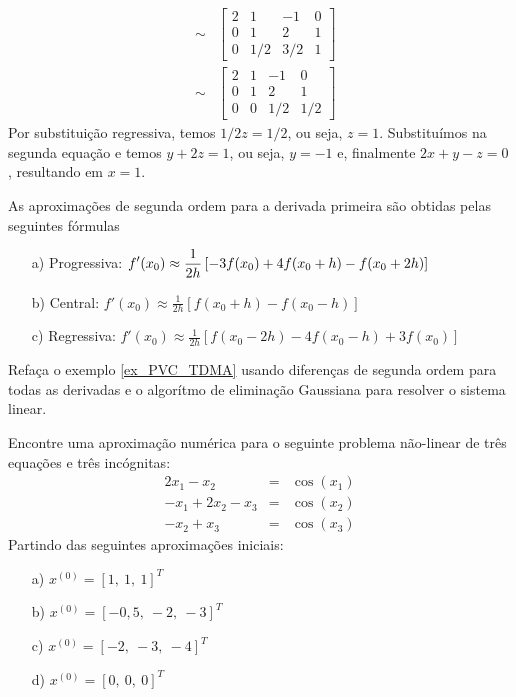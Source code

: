 \begin{exer}
\begin{eqnarray*}
    &\sim&
    \begin{bmatrix}
      2 &1& -1&0\\
      0 & 1 &2&1\\
      0 &1/2& 3/2&1
    \end{bmatrix}\\
    &\sim&
    \begin{bmatrix}
      2 &1& -1&0\\
      0 & 1 &2&1\\
      0 &0& 1/2&1/2
    \end{bmatrix}
\end{eqnarray*}
Por substituição regressiva, temos $1/2z=1/2$, ou seja, $z=1$. Substituímos na segunda equação e temos $y+2z=1$, ou seja, $y=-1$ e, finalmente $2x+y-z=0$, resultando em $x=1$.
\end{exer}

\begin{exer}As aproximações de segunda ordem para a derivada primeira são obtidas pelas seguintes fórmulas
\begin{itemize}
 \item[a)]Progressiva: $\displaystyle f'(x_0)\approx \frac{1}{2h}\left[-3f(x_0)+4f(x_{0}+h)
-f(x_{0}+2h)\right]\\$
 \item[b)]Central: $\displaystyle f'(x_0)\approx\frac{1}{2h}\left[f(x_{0}+h)-f(x_0-h)\right]$
 \item[c)]Regressiva: $\displaystyle f'(x_0)\approx \frac{1}{2h}\left[f(x_0-2h)-4f(x_{0}-h)
+3f(x_{0})\right]$
\end{itemize}
Refaça o exemplo \ref{ex_PVC_TDMA} usando diferenças de segunda ordem para todas as derivadas e o algorítmo de eliminação Gaussiana para resolver o sistema linear.
\end{exer}
\begin{exer} Encontre uma aproximação numérica para o seguinte problema não-linear de três equações e três incógnitas:
\begin{eqnarray*}
2x_1-x_2&=&\cos(x_1)\\
-x_1+2x_2-x_3&=&\cos(x_2)\\
-x_2+	x_3&=&\cos(x_3)
\end{eqnarray*}
Partindo das seguintes aproximações iniciais:
\begin{itemize}
\item[a)] $x^{(0)}=[1,~1,~1]^T$
\item[b)] $x^{(0)}=[-0,5,~-2,~-3]^T$
\item[c)] $x^{(0)}=[-2,~-3,~-4]^T$
\item[d)] $x^{(0)}=[0,~0,~0]^T$
\end{itemize}
\end{exer}

